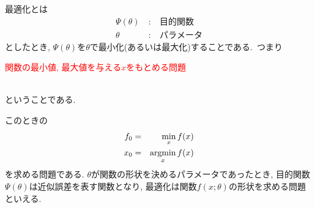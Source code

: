 最適化とは
\begin{eqnarray*}
  \Psi (\theta)\ &:&\ 目的関数\\
  \theta\ &:&\ パラメータ
\end{eqnarray*}
としたとき, $\Psi(\theta)$を$\theta$で最小化(あるいは最大化)することである.\ つまり\\
\centerline{\textcolor{red}{\large 関数の最小値, 最大値を与える$x$をもとめる問題}}\\
ということである.
\begin{center}
\end{center}
  このときの
\begin{eqnarray*}
    f_{0}&=&\underset{x}{\rm min}\,f(x)\\
    x_{0}&=&\underset{x}{\rm argmin}\,f(x)
\end{eqnarray*}
を求める問題である.
$\theta$が関数の形状を決めるパラメータであったとき, 目的関数$\Psi(\theta)$は近似誤差を表す関数となり, 最適化は関数$f(x;\theta)$の形状を求める問題といえる.